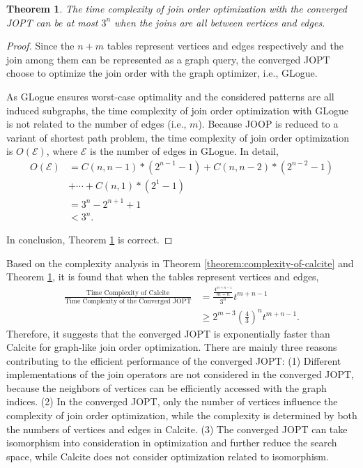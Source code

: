 \documentclass[sigconf, nonacm]{acmart}
\newtheorem{theorem}{Theorem}
\begin{document}
\begin{theorem}
    \label{theorem:complexity-of-glogue}
    The time complexity of join order optimization with the converged JOPT can be at most $3^n$ when the joins are all between vertices and edges.
\end{theorem}
\begin{proof}
    Since the $n + m$ tables represent vertices and edges respectively and the join among them can be represented as a graph query, the converged JOPT choose to optimize the join order with the graph optimizer, i.e., GLogue.

    As GLogue ensures worst-case optimality and the considered patterns are all induced subgraphs, the time complexity of join order optimization with GLogue is not related to the number of edges (i.e., $m$).
    Because JOOP is reduced to a variant of shortest path problem, the time complexity of join order optimization is $O(\mathcal{E})$, where $\mathcal{E}$ is the number of edges in GLogue.
    In detail, 
    \begin{equation*}
        \begin{split}
            O(\mathcal{E}) & = C(n, n-1)*(2^{n-1}-1) + C(n, n-2) * (2^{n-2}- 1) \\
            & + \cdots + C(n, 1) * (2^1 - 1) \\
            & = 3^n - 2^{n+1} +1 \\
            & < 3^n.
        \end{split}
    \end{equation*}
    
    In conclusion, Theorem \ref{theorem:complexity-of-glogue} is correct.

\end{proof}

Based on the complexity analysis in Theorem \ref{theorem:complexity-of-calcite} and Theorem \ref{theorem:complexity-of-glogue}, it is found that when the tables represent vertices and edges, 
\begin{equation*}
    \begin{split}
        \frac{\text{Time Complexity of Calcite}}{\text{Time Complexity of the Converged JOPT}} & = \frac{\frac{4^{m+n-1}}{m+n}}{3^n}t^{m+n-1} \\
        & \geq 2^{m-3}(\frac{4}{3})^nt^{m+n-1}.
    \end{split}
\end{equation*}
Therefore, it suggests that the converged JOPT is exponentially faster than Calcite for graph-like join order optimization.
There are mainly three reasons contributing to the efficient performance of the converged JOPT:
(1) Different implementations of the join operators are not considered in the converged JOPT, because the neighbors of vertices can be efficiently accessed with the graph indices.
(2) In the converged JOPT, only the number of vertices influence the complexity of join order optimization, while the complexity is determined by both the numbers of vertices and edges in Calcite.
(3) The converged JOPT can take isomorphism into consideration in optimization and further reduce the search space, while Calcite does not consider optimization related to isomorphism.
\end{document}
